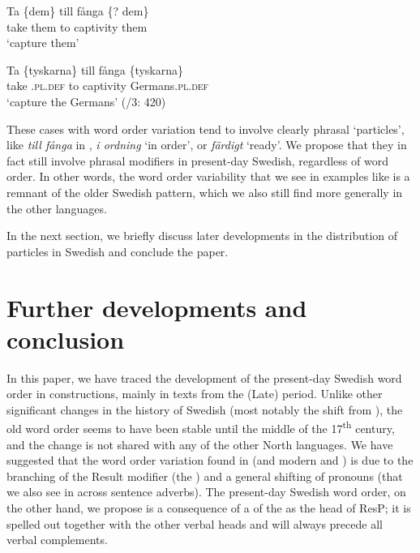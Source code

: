 \documentclass[output=paper]{langscibook}
\begin{document}
\ea\label{ex:lalu:63}
\ea
\gll Ta   \{dem\}   till   fånga       \{? dem\}\\
    take   them     to     captivity    {}   them\\
\glt `capture them'

\ex
\gll Ta   \{tyskarna\}       till   fånga     \{tyskarna\}\\
 take   \textsc{.pl.def}   to     captivity     Germans\textsc{.pl.def}\\
\glt `capture the Germans’ (\citealt{TelemanEtAl1999}/3: 420)\\
\z
\z


These cases with word order variation tend to involve clearly phrasal ‘particles’, like \textit{till fånga} in , \textit{i ordning} ‘in order’, or \textit{färdigt} ‘ready’. We propose that they in fact still involve phrasal modifiers in present-day Swedish, regardless of word order. In other words, the word order variability that we see in examples like  is a remnant of the older Swedish pattern, which we also still find more generally in the other  languages.



In the next section, we briefly discuss later developments in the distribution of particles in Swedish and conclude the paper.


\section{Further developments and conclusion}\label{sec:lalu:7}
In this paper, we have traced the development of the present-day Swedish word order in  constructions, mainly in texts from the (Late)  period. Unlike other significant changes in the history of Swedish (most notably the shift from ), the old word order seems to have been stable until the middle of the 17\textsuperscript{th} century, and the change is not shared with any of the other North  languages. We have suggested that the word order variation found in  (and modern  and ) is due to the branching of the Result modifier (the ) and a general shifting of pronouns (that we also see in  across sentence adverbs). The present-day Swedish word order, on the other hand, we propose is a consequence of a  of the  as the head of ResP; it is spelled out together with the other verbal heads and will always precede all verbal complements. 
\end{document}
